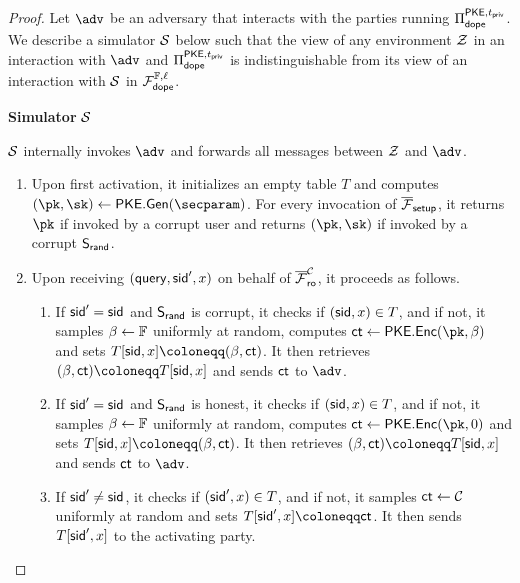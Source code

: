 \begin{proof}
	Let $\adv$ be an adversary that interacts with the parties running $\Pi_{\sf dope}^{\mathsf{PKE}, t_{\sf priv}}$.
	We describe a simulator $\mathcal{S}$ below such that the view of any environment $\mathcal{Z}$ in an interaction with $\adv$ and $\Pi_{\sf dope}^{\mathsf{PKE}, t_{\sf priv}}$ is indistinguishable from its view of an interaction with $\mathcal{S}$ in $\mathcal{F}_{\mathsf{dope}}^{\mathbb{F}, \ell}$.

	\begin{techbox}
		\begin{center}
			\textbf{Simulator} $\mathcal{S}$
		\end{center}


		$\mathcal{S}$ internally invokes $\adv$ and forwards all messages between $\mathcal{Z}$ and $\adv$.

		\begin{enumerate}
			\item Upon first activation, it initializes an empty table $T$ and computes $(\pk, \sk) \gets \encscheme.\Gen(\secparam)$.
			      For every invocation of $\overline{\mathcal{F}}_{\mathsf{setup}}$, it returns $\pk$ if invoked by a corrupt user and returns $(\pk, \sk)$ if invoked by a corrupt $\mathsf{S}_{\mathsf{rand}}$.

			\item Upon receiving $(\mathsf{query}, {\sf sid}', x)$ on behalf of $\overline{\mathcal{F}}_{\mathsf{ro}}^{\mathcal{C}}$, it proceeds as follows.
			      \begin{enumerate}
				      \item If ${\sf sid}' = {\sf sid}$ and $\mathsf{S}_{\mathsf{rand}}$ is corrupt, it checks if $({\sf sid}, x) \in T$, and if not, it samples $\beta \gets \mathbb{F}$ uniformly at random, computes $\ct \gets \encscheme.\Enc(\pk, \polycoeff)$ and sets $T[\sid, x] \coloneqq (\polycoeff, \ct)$.
				            It then retrieves $(\polycoeff, \ct) \coloneqq T[\sid, x]$ and sends $\mathsf{ct}$ to $\adv$.

				      \item If ${\sf sid}' = {\sf sid}$ and $\mathsf{S}_{\mathsf{rand}}$ is honest, it checks if $({\sf sid}, x) \in T$, and if not, it samples $\beta \gets \mathbb{F}$ uniformly at random, computes $\ct \gets \encscheme.\Enc(\pk, 0)$ and sets $T[\sid, x] \coloneqq (\polycoeff, \ct)$.
				            It then retrieves $(\polycoeff, \ct) \coloneqq T[\sid, x]$ and sends $\mathsf{ct}$ to $\adv$.

				      \item If ${\sf sid}' \neq {\sf sid}$, it checks if $({\sf sid}', x) \in T$, and if not, it samples $\mathsf{ct} \gets \mathcal{C}$ uniformly at random and sets $T[\sid', x] \coloneqq \ct$.
				            It then sends $T[{\sf sid}', x]$ to the activating party.
			      \end{enumerate}


\end{enumerate}
\end{techbox}
\end{proof}
